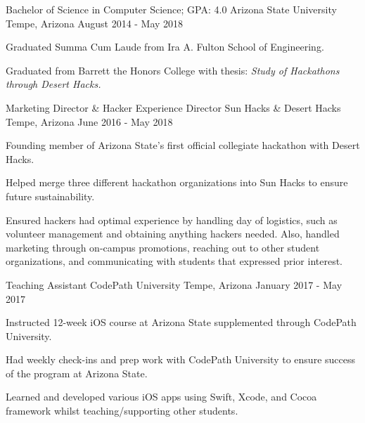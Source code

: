 \documentclass[
    changecolor={96, 52, 177},
]{peter-resume}
\begin{document}
\cventry
  {Bachelor of Science in Computer Science; GPA: 4.0}
  {Arizona State University}
  {Tempe, Arizona}
  {August 2014 - May 2018}
  {
    \begin{cvitems}
      \item {Graduated Summa Cum Laude from Ira A. Fulton School of Engineering.}
      \item {Graduated from Barrett the Honors College with thesis: \it{Study of Hackathons through Desert Hacks}.}
    \end{cvitems}
  }

\cventry
  {Marketing Director \& Hacker Experience Director}
  {Sun Hacks \& Desert Hacks}
  {Tempe, Arizona}
  {June 2016 - May 2018}
  {
    \begin{cvitems}
      \item {Founding member of Arizona State's first official collegiate hackathon with Desert Hacks.}
      \item {Helped merge three different hackathon organizations into Sun Hacks to ensure future sustainability.}
      \item {Ensured hackers had optimal experience by handling day of logistics, such as volunteer management and obtaining anything hackers needed. Also, handled marketing through on-campus promotions, reaching out to other student organizations, and communicating with students that expressed prior interest.}
    \end{cvitems}
  }
\cventry
  {Teaching Assistant}
  {CodePath University}
  {Tempe, Arizona}
  {January 2017 - May 2017}
  {
    \begin{cvitems}
      \item {Instructed 12-week iOS course at Arizona State supplemented through CodePath University.}
      \item {Had weekly check-ins and prep work with CodePath University to ensure success of the program at Arizona State.}
      \item {Learned and developed various iOS apps using Swift, Xcode, and Cocoa framework whilst teaching/supporting other students.}
    \end{cvitems}
  }

  \begin{cvskills}
  \end{cvskills}
\end{document}
